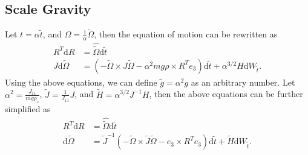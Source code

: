 \documentclass[10pt]{article}
\newcommand{\diff}[1]{\mathrm{d}#1}
\begin{document}
\subsection{Scale Gravity}

Let $t = \alpha\tilde{t}$, and $\Omega = \tfrac{1}{\alpha}\tilde{\Omega}$, then the equation of motion can be rewritten as
\begin{align*}
	R^T\diff{R} &= \hat{\tilde{\Omega}} \diff{\tilde{t}} \\
	J\diff{\tilde{\Omega}} &= (-\tilde{\Omega}\times J\tilde{\Omega} - \alpha^2mg\rho\times R^Te_3) \diff{\tilde{t}} + \alpha^{3/2} H \diff{W_{\tilde{t}}}.
\end{align*}
Using the above equations, we can define $\tilde{g} = \alpha^2 g$ as an arbitrary number.
Let $\alpha^2 = \frac{J_{11}}{mg\rho_z}$, $\tilde{J} = \frac{1}{J_{11}}J$, and $\tilde{H} = \alpha^{3/2}J^{-1}H$, then the above equations can be further simplified as
\begin{align*}
	R^T\diff{R} &= \hat{\tilde{\Omega}} \diff{\tilde{t}} \\
	\diff{\tilde{\Omega}} &= \tilde{J}^{-1} (-\tilde{\Omega}\times \tilde{J}\tilde{\Omega} - e_3\times R^Te_3) \diff{\tilde{t}} + \tilde{H}\diff{W_{\tilde{t}}}.
\end{align*}
\end{document}
